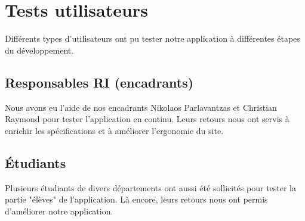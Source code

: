 \section{Tests utilisateurs}
Différents types d'utilisateurs ont pu tester notre application à différentes étapes du développement.
\subsection{Responsables RI (encadrants)}
Nous avons eu l'aide de nos encadrants Nikolaos Parlavantzas et Christian Raymond pour tester l'application en continu. Leurs retours nous ont servis à enrichir les spécifications et à améliorer l'ergonomie du site.
\subsection{Étudiants}
Plusieurs étudiants de divers départements ont aussi été sollicités pour tester la partie "élèves" de l'application. Là encore, leurs retours nous ont permis d'améliorer notre application.